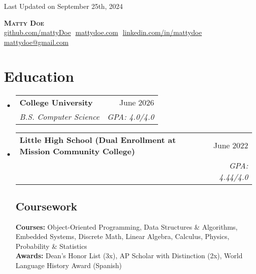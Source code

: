 \documentclass[letterpaper,11pt]{article}
\makeatletter
\newcommand{\resumeSubheading}[4]{
  \vspace{-2pt}\item
    \begin{tabular*}{0.97\textwidth}[t]{l@{\extracolsep{\fill}}r}
      \textbf{#1} & {\small #2} \\
      \textit{\small#3} & \textit{\small #4} \\
    \end{tabular*}\vspace{-7pt}
}
\newcommand{\resumeSubHeadingListStart}{\begin{itemize}[leftmargin=0.15in, label={}]}
\newcommand{\resumeSubHeadingListEnd}{\end{itemize}}
\makeatother
\begin{document}
\begin{flushright}
  \color{gray}
  \item
  Last Updated on September 25th, 2024
\end{flushright}

\vspace{-5pt}

\begin{center}
    \textbf{\Huge \scshape Matty Doe} \\ \vspace{8pt}
    \small 
    \href{https://github.com/mattyDoe}{\underline{github.com/mattyDoe}} $  $
    \href{https://www.mattydoe.com}{\underline{mattydoe.com}} $  $
    \href{https://linkedin.com/in/mattydoe}{\underline{linkedin.com/in/mattydoe}} $  $
    \href{mailto:mattydoe@gmail.com}{\underline{mattydoe@gmail.com}}
\end{center}

\section{Education}
  \resumeSubHeadingListStart
  
    \resumeSubheading
      {College University}{June 2026}
      {B.S. Computer Science}{GPA: 4.0/4.0}
      
    \resumeSubheading
      {Little High School \footnotesize{(Dual Enrollment at Mission Community College)}}{June 2022}
      {}{GPA: 4.44/4.0}

    \vspace{-10pt}

    \subsection{Coursework}
      \textbf{Courses:} Object-Oriented Programming, Data Structures \& Algorithms, Embedded Systems, Discrete Math, Linear Algebra, Calculus, Physics, Probability \& Statistics \\
      \textbf{Awards:} Dean's Honor List (3x), AP Scholar with Distinction (2x), World Language History Award (Spanish)

  \resumeSubHeadingListEnd

\end{document}

